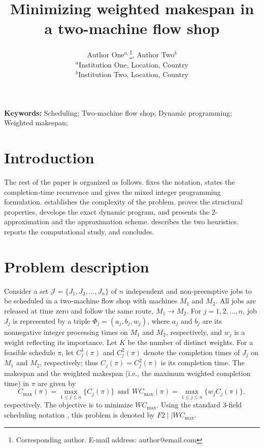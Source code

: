 \documentclass[12pt]{article}
\title{\LARGE\bf Minimizing weighted makespan in a two-machine flow shop}
\author{Author One$^{a,}$\footnote{Corresponding author. E-mail address: author@email.com}, Author Two$^{b}$\\
    {\small $^{a}$Institution One, Location, Country}\\
    {\small $^{b}$Institution Two, Location, Country}\\}
\date{}
\let\origsection\section
\renewcommand{\section}{\FloatBarrier\origsection}
\begin{document}
    \begin{sloppypar}
        
        \maketitle
        
        \begin{abstract}
            
        \end{abstract}
        
        \noindent \textbf{Keywords:} Scheduling; Two-machine flow shop; Dynamic programming; Weighted makespan; 
        
        \section{Introduction} \label{sec:intro}
        
        
        
        The rest of the paper is organized as follows.  fixes
        the notation, states the completion-time recurrence and gives the mixed integer programming
        formulation.  establishes the complexity of the problem.  proves the
        structural properties, develops the exact dynamic program, and presents the
        2-approximation and the approximation scheme.  describes
        the two heuristics.  reports the computational study,
        and  concludes.
        
        \section{Problem description}    \label{sec:preliminaries}
        
        Consider a set $\mathcal{J} = \{J_1, J_2, \dots, J_n\}$ of $n$ independent and non-preemptive jobs to be scheduled in a two-machine flow shop with machines $M_1$ and $M_2$. All jobs are released at time zero and follow the same route, $M_1 \to M_2$. For $j=1, 2, \ldots, n$, job $J_j$ is represented by a triple $\Phi_j=(a_j, b_j, w_j)$, where $a_j$ and $b_j$ are its nonnegative integer processing times on $M_1$ and $M_2$, respectively, and $w_j$ is a weight reflecting its importance. Let $K$ be the number of distinct weights. For a feasible schedule $\pi$, let $C_j^1(\pi)$ and $C_j^2(\pi)$ denote the completion times of $J_j$ on $M_1$ and $M_2$, respectively; thus $C_j(\pi)=C_j^2(\pi)$ is its completion time. The makespan and the weighted makespan (i.e., the maximum weighted completion time) in $\pi$ are given by 
        \begin{equation*}
            C_{\max}(\pi)=\max_{1 \leq j \leq n} \{C_j(\pi)\} ~~ \mathrm{and} ~~ WC_{\max}(\pi)=\max_{1 \leq j \leq n} \{w_j C_j(\pi)\},
        \end{equation*} 
        respectively. The objective is to minimize $WC_{\max}$. Using the standard 3-field scheduling notation \citep{Pinedo2022scheduling}, this problem is denoted by $F2 \mid \mid W C_{\max}$.
        

\end{sloppypar}
\end{document}
